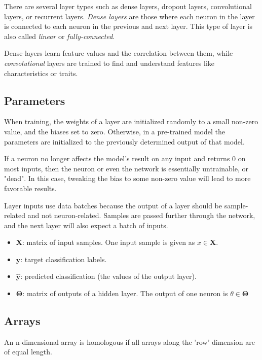 \documentclass[a4paper]{report}
\newcommand{\matr}[1]{\mathbf{#1}}
\newcommand{\vect}[1]{\bm{#1}}
\begin{document}
There are several layer types such as dense layers, dropout layers, convolutional layers, or recurrent layers. \emph{Dense layers} are those where each neuron in the layer is connected to each neuron in the previous and next layer. This type of layer is also called \emph{linear} or \emph{fully-connected}.

Dense layers learn feature values and the correlation between them, while \emph{convolutional} layers are trained to find and understand features like characteristics or traits. 

\subsection*{Parameters}
When training, the weights of a layer are initialized randomly to a small non-zero value, and the biases set to zero. Otherwise, in a pre-trained model the parameters are initialized to the previously determined output of that model. 

If a neuron no longer affects the model's result on any input and returns 0 on most inputs, then the neuron or even the network is essentially untrainable, or "dead". In this case, tweaking the bias to some non-zero value will lead to more favorable results. 

Layer inputs use data batches because the output of a layer should be sample-related and not neuron-related. Samples are passed further through the network, and the next layer will also expect a batch of inputs. 

\begin{itemize}
    \item $\matr{X}$: matrix of input samples. One input sample is given as $x \in \matr{X}$.
    \item $\bm{y}$: target classification labels.
    \item $\vect{\hat{y}}$: predicted classification (the values of the output layer).
    \item $\matr{\Theta}$: matrix of outputs of a hidden layer. The output of one neuron is $\theta \in \matr{\Theta}$
\end{itemize}


\subsection*{Arrays}
An n-dimensional array is homologous if all arrays along the 'row' dimension are of equal length.
\end{document}
